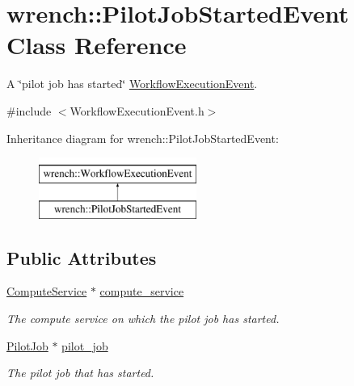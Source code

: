 \hypertarget{classwrench_1_1_pilot_job_started_event}{}\section{wrench\+:\+:Pilot\+Job\+Started\+Event Class Reference}
\label{classwrench_1_1_pilot_job_started_event}


A \char`\"{}pilot job has started\char`\"{} \hyperlink{classwrench_1_1_workflow_execution_event}{Workflow\+Execution\+Event}.  




{\ttfamily \#include $<$Workflow\+Execution\+Event.\+h$>$}

Inheritance diagram for wrench\+:\+:Pilot\+Job\+Started\+Event\+:\begin{figure}[H]
\begin{center}
\leavevmode
\includegraphics[height=2.000000cm]{classwrench_1_1_pilot_job_started_event}
\end{center}
\end{figure}
\subsection*{Public Attributes}
\begin{DoxyCompactItemize}
\item 
\mbox{\label{classwrench_1_1_pilot_job_started_event_a761239b10cbab789c1fbead4aaa3ee34}} 
\hyperlink{classwrench_1_1_compute_service}{Compute\+Service} $\ast$ \hyperlink{classwrench_1_1_pilot_job_started_event_a761239b10cbab789c1fbead4aaa3ee34}{compute\+\_\+service}
\begin{DoxyCompactList}\small\item\em The compute service on which the pilot job has started. \end{DoxyCompactList}\item 
\mbox{\label{classwrench_1_1_pilot_job_started_event_ac5415bb05bddcf669164022d88b92475}} 
\hyperlink{classwrench_1_1_pilot_job}{Pilot\+Job} $\ast$ \hyperlink{classwrench_1_1_pilot_job_started_event_ac5415bb05bddcf669164022d88b92475}{pilot\+\_\+job}
\begin{DoxyCompactList}\small\item\em The pilot job that has started. \end{DoxyCompactList}\end{DoxyCompactItemize}
